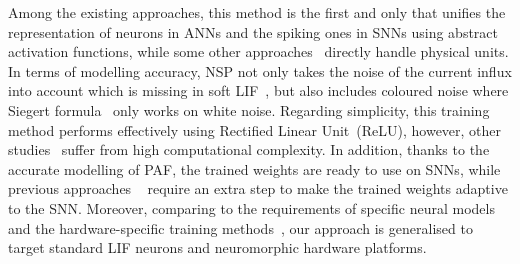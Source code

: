 

Among the existing approaches, this method is the first and only that unifies the representation of neurons in ANNs and the spiking ones in SNNs using abstract activation functions, while some other approaches~\citep{Jug_etal_2012,hunsberger2015spiking} directly handle physical units.
In terms of modelling accuracy, NSP not only takes the noise of the current influx into account which is missing in soft LIF~\citep{hunsberger2015spiking}, but also includes coloured noise where Siegert formula~\citep{Jug_etal_2012} only works on white noise.
Regarding simplicity, this training method performs effectively using Rectified Linear Unit~(ReLU), however, other studies~\citep{Jug_etal_2012,hunsberger2015spiking} suffer from high computational complexity.
In addition, thanks to the accurate modelling of PAF, the trained weights are ready to use on SNNs, while previous approaches ~\citep{cao2015spiking,diehl2015fast} require an extra step to make the trained weights adaptive to the SNN.
Moreover, comparing to the requirements of specific neural models~\citep{cao2015spiking,diehl2015fast} and the hardware-specific training methods~\citep{diehl2016conversion,diehl2016truehappiness,esser2015backpropagation}, our approach is generalised to target standard LIF neurons and neuromorphic hardware platforms.

